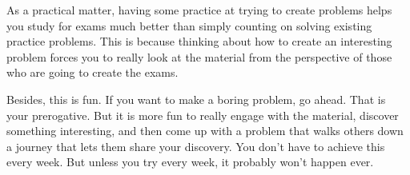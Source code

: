 \documentclass[preview]{standalone}
\begin{document}
As a practical matter, having some practice at trying to create
problems helps you study for exams much better than simply counting on
solving existing practice problems. This is because thinking about how
to create an interesting problem forces you to really look at the
material from the perspective of those who are going to create the
exams. 

Besides, this is fun. If you want to make a boring problem, go
ahead. That is your prerogative. But it is more fun to really engage
with the material, discover something interesting, and then come up
with a problem that walks others down a journey that lets them share
your discovery. You don't have to achieve this every week. But unless
you try every week, it probably won't happen ever. 
\end{document}
